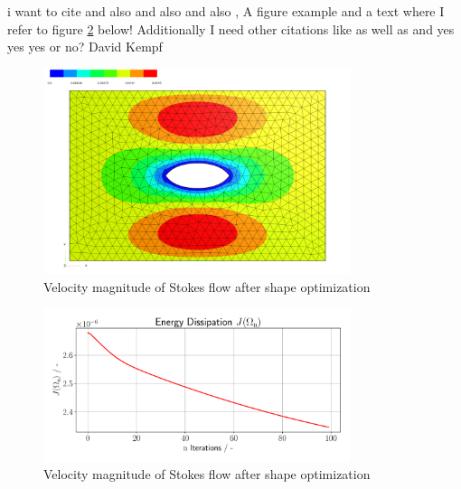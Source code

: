 i want to cite \cite{fully_semi_paper_sturm}
and also \cite{vol_bary_constraint_paper} and also \cite{lecture_notes_sturm} and also \cite{nearly_conformal_paper}, 
A figure example and a text where I refer to figure \ref{shape_opt_plot} below! Additionally I need other citations like \cite{lecture_notes_faustmann_numPDE}
as well as \cite{lecture_notes_faustmann_AMF} and \cite{lecture_notes_melenk_numcomp}
yes yes yes or no? David Kempf
\begin{figure}[ht]
    \centering
    \includegraphics[width=0.8\textwidth]{figures/solution_shape_opt.PNG}
	\caption{Velocity magnitude of Stokes flow after shape optimization}
	\label{shape_opt_plot}
\end{figure}

\begin{figure}[ht]
    \centering
    \includegraphics[width=0.8\textwidth]{figures/energy_diss_plot.pdf}
	\caption{Velocity magnitude of Stokes flow after shape optimization}
	\label{shape_opt_plot}
\end{figure}